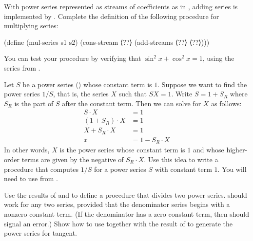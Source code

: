 \begin{exercise}
	\label{Exercise 3.60}
	With power series represented as streams of coefficients as in , adding series is implemented by .
	Complete the definition of the following procedure for multiplying series:
	\begin{scheme}
	  (define (mul-series s1 s2)
	    (cons-stream ⟨??⟩ (add-streams ⟨??⟩ ⟨??⟩)))
	\end{scheme}
	You can test your procedure by verifying that \( \sin^2 x + \cos^2 x = 1 \), using the series from .
\end{exercise}



\begin{exercise}
	\label{Exercise 3.61}
	Let \( S \) be a power series () whose constant term is \( 1 \).
	Suppose we want to find the power series \( 1 / S \), that is, the series \( X \) such that \( S X = 1 \).
	Write \( S = 1 + S_R \) where \( S_R \) is the part of \( S \) after the constant term.
	Then we can solve for \( X \) as follows:
	\begin{align*}
		        S ⋅ X &= 1 \\
		(1 + S_R) ⋅ X &= 1 \\
		  X + S_R ⋅ X &= 1 \\
		            x &= 1 - S_R ⋅ X
	\end{align*}
	In other words, \( X \) is the power series whose constant term is \( 1 \) and whose higher-order terms are given by the negative of \( S_R ⋅ X \).
	Use this idea to write a procedure  that computes \( 1 / S \) for a power series \( S \) with constant term \( 1 \).
	You will need to use  from .
\end{exercise}



\begin{exercise}
	\label{Exercise 3.62}
	Use the results of  and  to define a procedure  that divides two power series.
	 should work for any two series, provided that the denominator series begins with a nonzero constant term.
	(If the denominator has a zero constant term, then  should signal an error.)
	Show how to use  together with the result of  to generate the power series for tangent.
\end{exercise}

